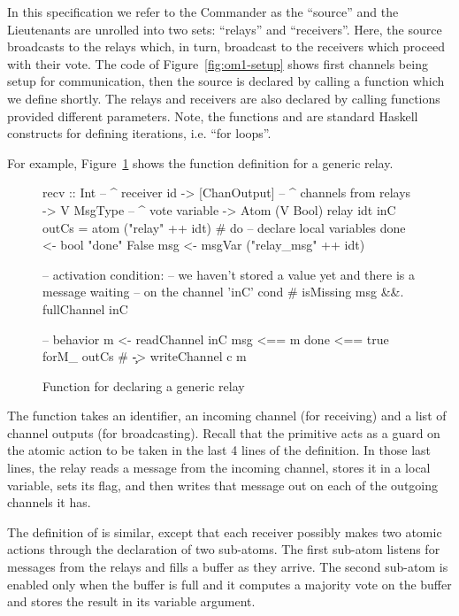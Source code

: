 In this specification we refer to the Commander as the ``source'' and the
Lieutenants are unrolled into two sets: ``relays'' and ``receivers''. Here,
the source broadcasts to the relays which, in turn, broadcast to the
receivers which proceed with their vote. The code of Figure~\ref{fig:om1-setup} shows first channels being setup for communication, then
the source is declared by calling a function which we define shortly. The
relays and receivers are also declared by calling functions provided different
parameters. Note, the functions  and  are standard Haskell
constructs for defining iterations, i.e. ``for loops''.

For example, Figure~\ref{fig:om1-relay} shows the function definition for a
generic relay.

\begin{figure}
\begin{lima}
recv :: Int           -- ^ receiver id
     -> [ChanOutput]  -- ^ channels from relays
     -> V MsgType     -- ^ vote variable
     -> Atom (V Bool)
relay idt inC outCs = atom ("relay" ++ idt) # do
  -- declare local variables
  done <- bool "done" False
  msg  <- msgVar ("relay_msg" ++ idt)

  -- activation condition:
  --   we haven't stored a value yet and there is a message waiting
  --   on the channel 'inC'
  cond # isMissing msg &&. fullChannel inC

  -- behavior
  m <- readChannel inC
  msg  <== m
  done <== true
  forM_ outCs # \c -> writeChannel c m
\end{lima}
\caption{Function for declaring a generic relay}
\label{fig:om1-relay}
\end{figure}

The  function takes an identifier, an incoming channel (for
receiving) and a list of channel outputs (for broadcasting). Recall that the
 primitive acts as a guard on the atomic action to be taken in the
last 4 lines of the definition. In those last lines, the relay reads a message
from the incoming channel, stores it in a local variable, sets its 
flag, and then writes that message out on each of the outgoing channels it has.

The definition of  is similar, except that each receiver possibly makes two
atomic actions through the declaration of two sub-atoms. The first sub-atom
listens for messages from the relays and fills a buffer as they arrive. The
second sub-atom is enabled only when the buffer is full and it computes a
majority vote on the buffer and stores the result in its  variable
argument.

